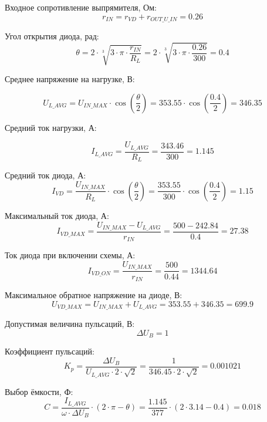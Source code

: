 Входное сопротивление выпрямителя, Ом:
\[
r_{IN}=r_{VD}+r_{OUT\_U\_IN}=0.26
\]

Угол открытия диода, рад:
\[
\theta=2 \cdot \sqrt[3]{3 \cdot \pi \cdot \frac{r_{IN}}{R_L}}=2 \cdot \sqrt[3]{3 \cdot \pi \cdot \frac{0.26}{300}}=0.4
\]


Среднее напряжение на нагрузке, В:

\[
U_{L\_AVG}=U_{IN\_MAX} \cdot \cos (\frac{\theta}{2})= 353.55 \cdot \cos(\frac{0.4}{2})=346.35
\]

Средний ток нагрузки, А:

\[
I_{L\_AVG}=\frac{U_{L\_AVG}}{R_L}=\frac{343.46}{300}=1.145
\]

Средний ток диода, А:
\[
I_{VD}=\frac{U_{IN\_MAX}}{R_L} \cdot \cos \left(\frac{\theta}{2}\right)=\frac{353.55}{300} \cdot \cos (\frac{0.4}{2})=1.15
\]

Максимальный ток диода, А:
\[
I_{VD\_MAX}=\frac{U_{IN\_MAX}-U_{L\_AVG}}{r_{IN}}=\frac{500-242.84}{0.4}=27.38
\]

Ток диода при включении схемы, А:
\[
I_{VD\_ON}=\frac{U_{IN\_MAX}}{r_{IN}}=\frac{500}{0.44}=1344.64
\]

Максимальное обратное напряжение на диоде, В:
\[
U_{VD\_MAX}=U_{IN\_MAX}+U_{L\_AVG}=353.55+346.35=699.9
\]


Допустимая величина пульсаций, В:
\[
\Delta U_B = 1
\]

Коэффициент пульсаций:
\[
K_p = \frac{\Delta U_B}{U_{L\_AVG}\cdot  2 \cdot \sqrt{2}}=\frac{1}{346.45 \cdot 2 \cdot \sqrt{2}}=0.001021
\]


Выбор ёмкости, Ф:
\[
C=\frac{I_{L\_AVG}}{\omega \cdot \Delta U_B} \cdot (2 \cdot \pi - \theta)= \frac{1.145}{377} \cdot (2 \cdot 3.14 - 0.4)=0.018
\]
